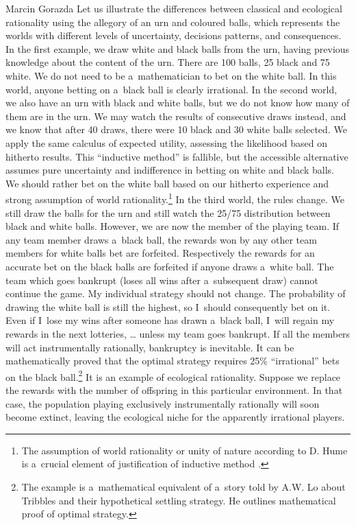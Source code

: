 \begin{artengenv}{Marcin Gorazda}
Let us illustrate the differences between classical and ecological rationality using the allegory of an urn and coloured balls, which represents the worlds with different levels of uncertainty, decisions patterns, and consequences. In the first example, we draw white and black balls from the urn, having previous knowledge about the content of the urn. There are 100 balls, 25 black and 75 white. We do not need to be a~mathematician to bet on the white ball. In this world, anyone betting on a~black ball is clearly irrational. In the second world, we also have an urn with black and white balls, but we do not know how many of them are in the urn. We may watch the results of consecutive draws instead, and we know that after 40 draws, there were 10 black and 30 white balls selected. We apply the same calculus of expected utility, assessing the likelihood based on hitherto results. This ``inductive method'' is fallible, but the accessible alternative assumes pure uncertainty and indifference in betting on white and black balls. We should rather bet on the white ball based on our hitherto experience and strong assumption of world rationality.\footnote{The assumption of world rationality or unity of nature according to D. Hume is a~crucial element of justification of inductive method
\parencite[][]{hume_treatise_2000}.%
} In the third world, the rules change. We still draw the balls for the urn and still watch the 25/75 distribution between black and white balls. However, we are now the member of the playing team. If any team member draws a~black ball, the rewards won by any other team members for white balls bet are forfeited. Respectively the rewards for an accurate bet on the black balls are forfeited if anyone draws a~white ball. The team which goes bankrupt (loses all wins after a~subsequent draw) cannot continue the game. My individual strategy should not change. The probability of drawing the white ball is still the highest, so I~should consequently bet on it. Even if I~lose my wins after someone has drawn a~black ball, I~will regain my rewards in the next lotteries, … unless my team goes bankrupt. If all the members will act instrumentally rationally, bankruptcy is inevitable. It can be mathematically proved that the optimal strategy requires 25\% ``irrational'' bets on the black ball.\footnote{The example is a~mathematical equivalent of a~story told by A.W. Lo 
\parencite*[][]{lo_adaptive_2017} %
 about Tribbles and their hypothetical settling strategy. He outlines mathematical proof of optimal strategy.} It is an example of ecological rationality. Suppose we replace the rewards with the number of offspring in this particular environment. In that case, the population playing exclusively instrumentally rationally will soon become extinct, leaving the ecological niche for the apparently irrational players.


\end{artengenv}
